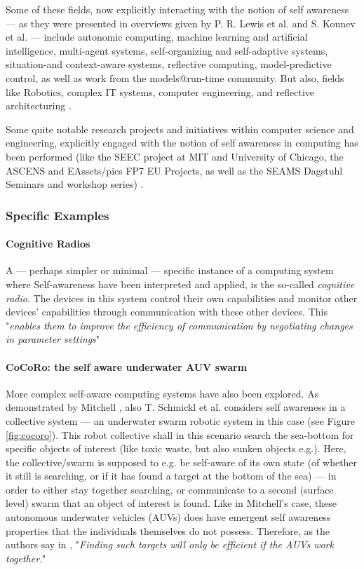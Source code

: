 	Some of these fields, now explicitly interacting with the notion of self awareness — as they were presented in overviews given by P. R. Lewis et al. \cite{sacs17_ch3} and S. Kounev et al. \cite{sacs17_ch1} — include autonomic computing, machine learning and artificial intelligence, multi-agent systems, self-organizing and self-adaptive systems, situation-and context-aware systems, reflective computing, model-predictive control, as well as work from the models@run-time community. But also, fields like Robotics, complex IT systems, computer engineering, and reflective architecturing \cite{sacs17_ch3}.

	Some quite notable research projects and initiatives within computer science and engineering, explicitly engaged with the notion of self awareness in computing has been performed (like the SEEC project at MIT and University of Chicago, the ASCENS and EAssets/pics FP7 EU Projects, as well as the SEAMS Dagstuhl Seminars and workshop series) \cite{sacs17_ch1}.


		\subsubsection{Specific Examples}

			\paragraph{Cognitive Radios \nl}

			A — perhaps simpler or minimal — specific instance of a computing system where Self-awareness have been interpreted and applied, is the so-called \textit{cognitive radio}. The devices in this system control their own capabilities and monitor other devices' capabilities through communication with these other devices. This "\textit{enables them to improve the efficiency of communication by negotiating changes in parameter settings}" \cite{sacs17_ch3}

			\paragraph{CoCoRo: the self aware underwater AUV swarm \nl}

			More complex self-aware computing systems have also been explored. As demonstrated by Mitchell \cite{mitchell_decentralizedSA}, also T. Schmickl et al. considers self awareness in a collective system — an underwater swarm robotic system \cite{cocoro} in this case (see Figure \ref{fig:cocoro}). This robot collective shall in this scenario search the sea-bottom for specific objects of interest (like toxic waste, but also sunken objects e.g.). Here, the collective/swarm is supposed to e.g. be self-aware of its own state (of whether it still is searching, or if it has found a target at the bottom of the sea) — in order to either stay together searching, or communicate to a second (surface level) swarm that an object of interest is found. Like in Mitchell's case, these autonomous underwater vehicles (AUVs) does have emergent self awareness properties that the individuals themselves do not possess. Therefore, as the authors say in \cite{cocoro}, "\textit{Finding such targets will only be efficient if the AUVs work together}."

